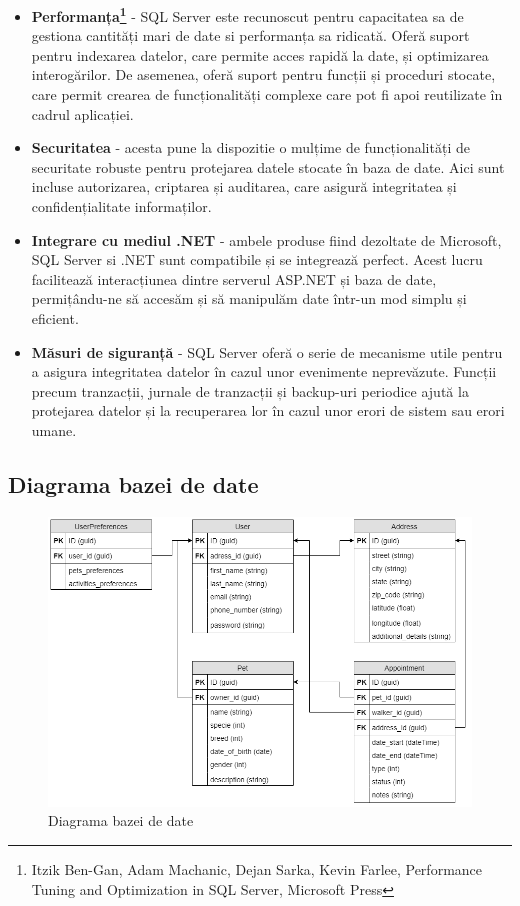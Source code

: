 \begin{itemize}
    \item \textbf{Performanța\footnote{Itzik Ben-Gan, Adam Machanic, Dejan Sarka, Kevin Farlee, Performance Tuning
    and Optimization in SQL Server, Microsoft Press}} - SQL Server este recunoscut pentru capacitatea sa de gestiona cantități mari de date si performanța sa ridicată. Oferă suport pentru indexarea datelor, care permite acces rapidă la date, și optimizarea interogărilor. De asemenea, oferă suport pentru funcții și proceduri stocate, care permit crearea de funcționalități complexe care pot fi apoi reutilizate în cadrul aplicației.
    \item \textbf{Securitatea} - acesta pune la dispozitie o mulțime de funcționalități de securitate robuste pentru protejarea datele stocate în baza de date. Aici sunt incluse autorizarea, criptarea și auditarea, care asigură integritatea și confidențialitate informaților.
    
    \newpage

    \item \textbf{Integrare cu mediul .NET} - ambele produse fiind dezoltate de Microsoft, SQL Server si .NET sunt compatibile și se integrează perfect. Acest lucru facilitează interacțiunea dintre serverul ASP.NET și baza de date, permițându-ne să accesăm și să manipulăm date într-un mod simplu și eficient.
    \item \textbf{Măsuri de siguranță} - SQL Server oferă o serie de mecanisme utile pentru a asigura integritatea datelor în cazul unor evenimente neprevăzute. Funcții precum tranzacții, jurnale de tranzacții și backup-uri periodice ajută la protejarea datelor și la recuperarea lor în cazul unor erori de sistem sau erori umane.
\end{itemize}

\subsection{Diagrama bazei de date}

\begin{figure}[ht]
    \centering
    \includegraphics[width=1\textwidth] {images/database.png}
    \caption{Diagrama bazei de date}
    \label{fig:database}
\end{figure}